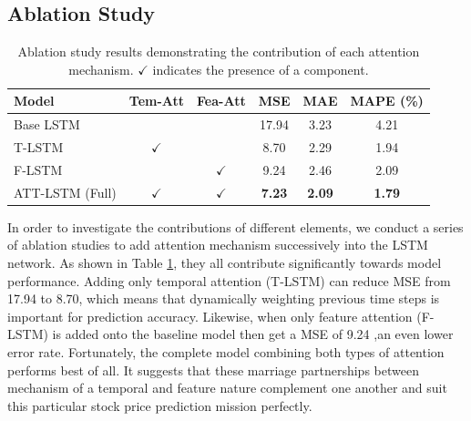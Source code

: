 \documentclass[10pt,twocolumn,letterpaper]{article}
\begin{document}
\subsection{Ablation Study}

\begin{table}[H]
	\setlength{\tabcolsep}{1.5pt} 
	\renewcommand{\arraystretch}{1.2} 
	\centering
	\begin{tabular}{l|c|c|c|c|c}
		\hline
		Model & Tem-Att& Fea-Att& MSE & MAE & MAPE (\%) \\
		\hline
		Base LSTM &  &  & 17.94 & 3.23 & 4.21 \\
		T-LSTM & $\checkmark$ &  & 8.70 & 2.29 & 1.94 \\
		F-LSTM &  & $\checkmark$ & 9.24 & 2.46 & 2.09 \\
		ATT-LSTM (Full) & $\checkmark$ & $\checkmark$ & \textbf{7.23} & \textbf{2.09} & \textbf{1.79} \\
		\hline
	\end{tabular}
	\caption{Ablation study results demonstrating the contribution of each attention mechanism. $\checkmark$ indicates the presence of a component.}
	\label{table:ablation}
\end{table}
In order to investigate the contributions of different elements, we conduct a series of ablation studies to add attention mechanism successively into the LSTM network. As shown in Table \ref{table:ablation}, they all contribute significantly towards model performance. Adding only temporal attention (T-LSTM) can reduce MSE from 17.94 to 8.70, which means that dynamically weighting previous time steps is important for prediction accuracy. Likewise, when only feature attention (F-LSTM) is added onto the baseline model then  get a MSE of 9.24 ,an even lower error rate. Fortunately, the complete model combining both types of attention performs best of all. It suggests that these marriage partnerships between mechanism of a temporal and feature nature complement one another and suit this particular stock price prediction mission perfectly.
\end{document}
